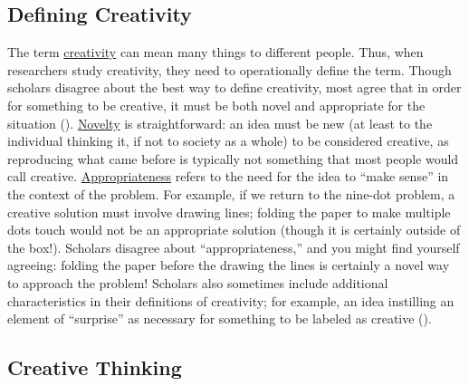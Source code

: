 \documentclass[
]{krantz}
\begin{document}
\subsection*{Defining Creativity}\label{defining-creativity}


The term \hyperref[creativity]{creativity} can mean many things to different people. Thus, when researchers study creativity, they need to operationally define the term. Though scholars disagree about the best way to define creativity, most agree that in order for something to be creative, it must be both novel and appropriate for the situation (). \hyperref[novelty]{Novelty} is straightforward: an idea must be new (at least to the individual thinking it, if not to society as a whole) to be considered creative, as reproducing what came before is typically not something that most people would call creative. \hyperref[appropriateness]{Appropriateness} refers to the need for the idea to ``make sense'' in the context of the problem. For example, if we return to the nine-dot problem, a creative solution must involve drawing lines; folding the paper to make multiple dots touch would not be an appropriate solution (though it is certainly outside of the box!). Scholars disagree about ``appropriateness,'' and you might find yourself agreeing: folding the paper before the drawing the lines is certainly a novel way to approach the problem! Scholars also sometimes include additional characteristics in their definitions of creativity; for example, an idea instilling an element of ``surprise'' as necessary for something to be labeled as creative ().

\subsection*{Creative Thinking}\label{creative-thinking}
\end{document}
